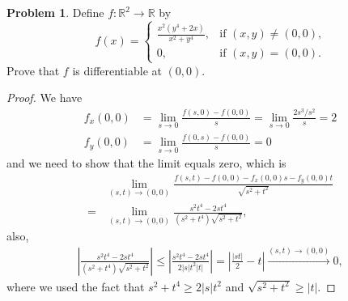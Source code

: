 \documentclass[11pt]{article}
\theoremstyle{definition}
\newtheorem{problem}{Problem}
\theoremstyle{definition}
\begin{document}
\begin{problem}
Define $f:\mathbb{R}^2\to\mathbb{R}$ by
$$
f(x)=
\begin{cases}
\frac{x^2(y^4+2x)}{x^2+y^4}, & \text{if $(x,y)\neq (0,0)$,}\\
0,                           & \text{if $(x,y)=(0,0)$.}
\end{cases}
$$
Prove that $f$ is differentiable at $(0,0)$.
\end{problem}
\begin{proof}
We have 
\begin{align*}
    f_x(0,0) & = \lim_{s\to 0} \frac{f(s,0) - f(0,0)}{s} = \lim_{s\to 0} \frac{2s^3/s^2}{s} = 2 \\
    f_y(0,0) & = \lim_{s\to 0} \frac{f(0,s) - f(0,0)}{s} = 0
\end{align*}
and we need to show that the limit equals zero, which is 
\begin{align*}
    & \lim_{(s,t)\to (0,0)} \frac{f(s,t) - f(0,0) - f_x(0,0)s - f_y(0,0)t}{\sqrt{s^2 + t^2}} \\
    = & \lim_{(s,t)\to (0,0)} \frac{s^2 t^4 - 2s t^4}{(s^2+t^4)\sqrt{s^2 + t^2}},
\end{align*}
also,
\begin{align*}
    \left|\frac{s^2 t^4 - 2s t^4}{(s^2+t^4)\sqrt{s^2 + t^2}}\right| \leq \left|\frac{s^2 t^4 - 2s t^4}{2 |s| t^2 |t|}\right| = \left| \frac{|st|}{2} - t \right| \xrightarrow{(s,t)\to (0,0)} 0,
\end{align*}
where we used the fact that $s^2 + t^4 \geq 2|s|t^2$ and $\sqrt{s^2 + t^2} \geq |t|$.
\end{proof}

\medskip
\end{document}
